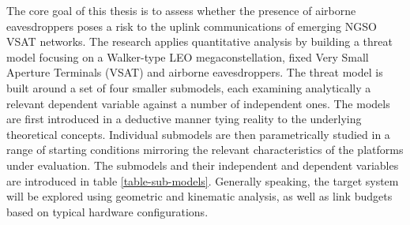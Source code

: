 \documentclass[english, 12pt, a4paper, elec, utf8, a-1b, online]{aaltothesis}
\begin{document}
The core goal of this thesis is to assess whether the presence of airborne eavesdroppers poses a risk to the uplink communications of emerging NGSO VSAT networks.
The research applies quantitative analysis by building a threat model focusing on a Walker-type LEO megaconstellation, fixed Very Small Aperture Terminals (VSAT) and airborne eavesdroppers.
The threat model is built around a set of four smaller submodels, each examining analytically a relevant dependent variable against a number of independent ones.
The models are first introduced in a deductive manner tying reality to the underlying theoretical concepts.
Individual submodels are then parametrically studied in a range of starting conditions mirroring the relevant characteristics of the platforms under evaluation.
The submodels and their independent and dependent variables are introduced in table \ref{table-sub-models}. Generally speaking, the target system will be explored using geometric and kinematic analysis, as well as link budgets based on typical hardware configurations.
\end{document}
